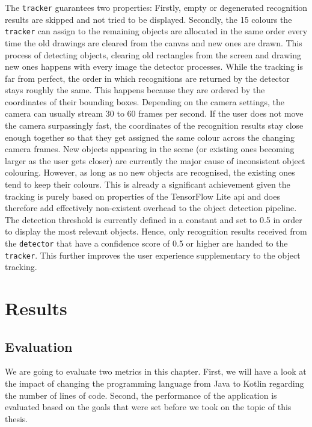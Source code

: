 \documentclass[
			   fontsize=11pt,
               paper=a4,
               bibliography=totoc,
               idxtotoc,
               headsepline,
               footsepline,
               footinclude=false,
               BCOR=12mm,
               DIV=13,
               openany,   %
               oneside    %
               ]
               {scrbook}
\newcommand{\code}[1]{\lstinline[basicstyle = \ttfamily\small]{#1}} %
\begin{document}
The \code{tracker} guarantees two properties: Firstly, empty or degenerated recognition results are skipped and not tried to be displayed. Secondly, the 15 colours the \code{tracker} can assign to the remaining objects are  allocated in the same order every time the old drawings are cleared from the canvas and new ones are drawn. This process of detecting objects, clearing old rectangles from the screen and drawing new ones happens with every image the detector processes. While the tracking is far from perfect, the order in which recognitions are returned by the detector stays roughly the same. This happens because they are ordered by the coordinates of their bounding boxes. Depending on the camera settings, the camera can usually stream 30 to 60 frames per second. If the user does not move the camera surpassingly fast, the coordinates of the recognition results stay close enough together so that they get assigned the same colour across the changing camera frames. New objects appearing in the scene (or existing ones becoming larger as the user gets closer) are currently the major cause of inconsistent object colouring. However, as long as no new objects are recognised, the existing ones tend to keep their colours. This is already a significant achievement given the tracking is purely based on properties of the TensorFlow Lite \gls{api} and does therefore add effectively non-existent overhead to the object detection pipeline. \\

The detection threshold is currently defined in a constant and set to 0.5 in order to display the most relevant objects. Hence, only recognition results received from the \code{detector} that have a confidence score of 0.5 or higher are handed to the \code{tracker}. This further improves the user experience supplementary to the object tracking.

\part{Results}

\chapter{Evaluation}

We are going to evaluate two metrics in this chapter. First, we will have a look at the impact of changing the programming language from Java to Kotlin regarding the number of lines of code. Second, the performance of the application is evaluated based on the goals that were set before we took on the topic of this thesis.
\end{document}
